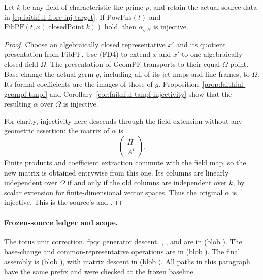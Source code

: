 \begin{srcorollary}\label{cor:faithful-fibpf-injectivity}
Let \(k\) be any field of characteristic the prime \(p\),
and retain the actual source data in
\eqref{eq:faithful-fibre-inj-target}.
If \(\mathrm{PowFns}(t)\) and
\(\mathrm{FibPF}(t,x(\operatorname{closedPoint}k))\)
hold, then \(\alpha_{g.B}\) is injective.
\end{srcorollary}
\begin{proof}
Choose an algebraically closed representative \(x'\)
and its quotient presentation from \(\mathrm{FibPF}\).
Use (FD4) to extend \(x\) and \(x'\) to one algebraically
closed field \(\Omega\).
The presentation of \(\mathrm{GeomPF}\) transports to
their equal \(\Omega\)-point.
Base change the actual germ \(g\), including all of its
jet maps and line frames, to \(\Omega\).
Its formal coefficients are the images of those of \(g\).
Proposition~\ref{prop:faithful-geompf-tanpf} and
Corollary~\ref{cor:faithful-tanpf-injectivity} show that
the resulting \(\alpha\) over \(\Omega\) is injective.

For clarity, injectivity here descends through the field
extension without any geometric assertion:
the matrix of \(\alpha\) is
\[
                              \begin{pmatrix}H\\A^t\end{pmatrix}.
\]
Finite products and coefficient extraction commute with
the field map, so the new matrix is obtained entrywise
from this one.
Its columns are linearly independent over \(\Omega\)
if and only if the old columns are independent over \(k\),
by scalar extension for finite-dimensional vector spaces.
Thus the original \(\alpha\) is injective.
This is the source's 
and .
\end{proof}

\paragraph{Frozen-source ledger and scope.}
The torus unit correction, fpqc generator descent,
, , and
 are in
(blob ).
The base-change and common-representative operations are in
(blob ).
The final assembly is 
(blob ),
with matrix descent in 
(blob ).
All paths in this paragraph have the same
 prefix and were checked at the
frozen baseline.


